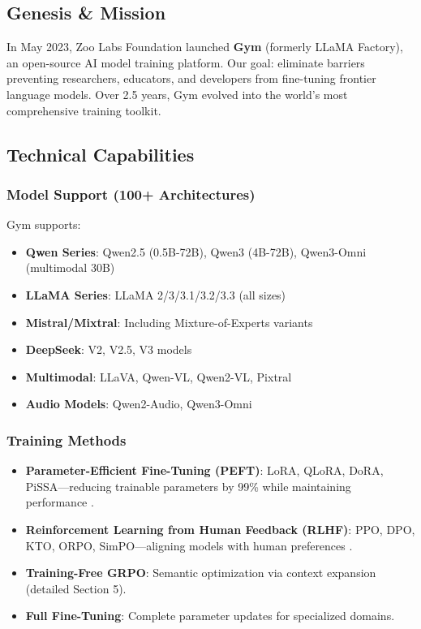 \documentclass[twocolumn,11pt]{article}
\begin{document}
\subsection{Genesis \& Mission}

In May 2023, Zoo Labs Foundation launched \textbf{Gym} (formerly LLaMA Factory), an open-source AI model training platform. Our goal: eliminate barriers preventing researchers, educators, and developers from fine-tuning frontier language models. Over 2.5 years, Gym evolved into the world's most comprehensive training toolkit.

\subsection{Technical Capabilities}

\subsubsection{Model Support (100+ Architectures)}
Gym supports:
\begin{itemize}
    \item \textbf{Qwen Series}: Qwen2.5 (0.5B-72B), Qwen3 (4B-72B), Qwen3-Omni (multimodal 30B) \citep{alibaba2024qwen3}
    \item \textbf{LLaMA Series}: LLaMA 2/3/3.1/3.2/3.3 (all sizes) \citep{meta2024llama3}
    \item \textbf{Mistral/Mixtral}: Including Mixture-of-Experts variants
    \item \textbf{DeepSeek}: V2, V2.5, V3 models \citep{deepseek2024v3}
    \item \textbf{Multimodal}: LLaVA, Qwen-VL, Qwen2-VL, Pixtral
    \item \textbf{Audio Models}: Qwen2-Audio, Qwen3-Omni
\end{itemize}

\subsubsection{Training Methods}
\begin{itemize}
    \item \textbf{Parameter-Efficient Fine-Tuning (PEFT)}: LoRA, QLoRA, DoRA, PiSSA—reducing trainable parameters by 99\% while maintaining performance \citep{hu2021lora, dettmers2023qlora}.
    \item \textbf{Reinforcement Learning from Human Feedback (RLHF)}: PPO, DPO, KTO, ORPO, SimPO—aligning models with human preferences \citep{ouyang2022training, rafailov2023dpo}.
    \item \textbf{Training-Free GRPO}: Semantic optimization via context expansion (detailed Section 5).
    \item \textbf{Full Fine-Tuning}: Complete parameter updates for specialized domains.
\end{itemize}
\end{document}

